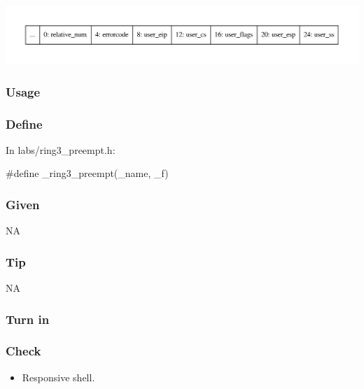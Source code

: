 \documentclass[]{book}
\newenvironment{Shaded}{}{}
\newcommand{\OtherTok}[1]{{#1}}
\begin{document}
\includegraphics{graphviz-images/4b94c712fc5d8fc832a722cc09de70139197fc2d.pdf}

\subsubsection*{Usage}\label{usage-10}

\subsubsection*{Define}\label{define-10}

In labs/ring3\_preempt.h:

\begin{Shaded}
\begin{Highlighting}[]
   \OtherTok{#define _ring3_preempt(_name, _f)}
\end{Highlighting}
\end{Shaded}

\subsubsection*{Given}\label{given-10}

NA

\subsubsection*{Tip}\label{tip-10}

NA

\subsubsection*{Turn in}\label{turn-in-10}

\subsubsection*{Check}\label{check-10}

\begin{itemize}
\itemsep1pt\parskip0pt
\item
  Responsive shell.
\end{itemize}
\end{document}
